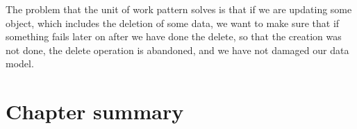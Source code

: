 The problem that the unit of work pattern solves is that if we are updating some object, which includes the deletion of some data, we want to make sure that if something fails later on after we have done the delete, so that the creation was not done, the delete operation is abandoned, and we have not damaged our data model\cite{uow}.

\section{Chapter summary}
